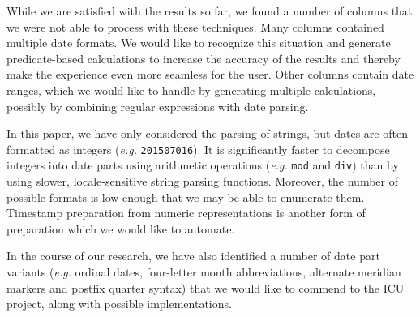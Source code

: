 While we are satisfied with the results so far, we found a number of columns that we were not able to process with these techniques. Many columns contained multiple date formats. We would like to recognize this situation and generate predicate-based calculations to increase the accuracy of the results and thereby make the experience even more seamless for the user. Other columns contain date ranges, which we would like to handle by generating multiple calculations, possibly by combining regular expressions with date parsing.

In this paper, we have only considered the parsing of strings, but dates are often formatted as integers (\textit{e.g.} \texttt{201507016}). It is significantly faster to decompose integers into date parts using arithmetic operations (\textit{e.g.} \texttt{mod} and \texttt{div}) than by using slower, locale-sensitive string parsing functions. Moreover, the number of possible formats is low enough that we may be able to enumerate them. Timestamp preparation from numeric representations is another form of preparation which we would like to automate.

In the course of our research, we have also identified a number of date part variants (\textit{e.g.} ordinal dates, four-letter month abbreviations, alternate meridian markers and postfix quarter syntax) that we would like to commend to the ICU project, along with possible implementations.
